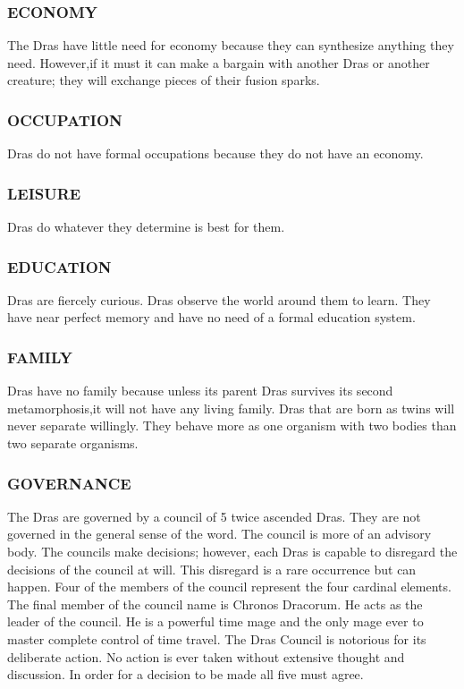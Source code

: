 \subsubsection{ECONOMY}
The Dras have little need for economy because they can synthesize anything they
need.  However,if it must it can make a bargain with another Dras or another
creature; they will exchange pieces of their fusion sparks.
\subsubsection{OCCUPATION}
Dras do not have formal occupations because they do not have an economy.
\subsubsection{LEISURE}
Dras do whatever they determine is best for them.
\subsubsection{EDUCATION}
Dras are fiercely curious.  Dras observe the world around them to learn.  They
have near perfect memory and have no need of a formal education system.
\subsubsection{FAMILY}
Dras have no family because unless its parent Dras survives its second
metamorphosis,it will not have any living family.  Dras that are born as twins
will never separate willingly.  They behave more as one organism with two
bodies than two separate organisms.
\subsubsection{GOVERNANCE}
The Dras are governed by a council of 5 twice ascended Dras.  They are not
governed in the general sense of the word.  The council is more of an advisory
body.  The councils make decisions; however, each Dras is capable to disregard
the decisions of the council at will.  This disregard is a rare occurrence but
can happen.  Four of the members of the council represent the four cardinal
elements.  The final member of the council name is Chronos Dracorum.  He acts
as the leader of the council.  He is a powerful time mage and the only mage
ever to master complete control of time travel. The Dras Council is notorious
for its deliberate action.  No action is ever taken without extensive thought
and discussion.  In order for a decision to be made all five must agree.  
